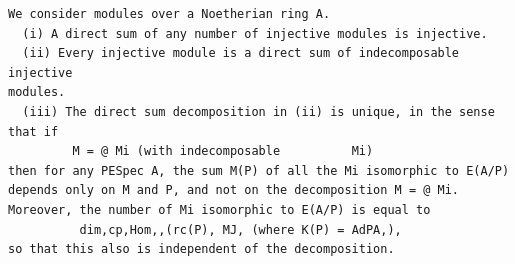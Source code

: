 \begin{theorem}\label{mcrt-auto-theorem-18-5}\uses{}
\begin{verbatim}
We consider modules over a Noetherian ring A.
  (i) A direct sum of any number of injective modules is injective.
  (ii) Every injective module is a direct sum of indecomposable injective
modules.
  (iii) The direct sum decomposition in (ii) is unique, in the sense that if
         M = @ Mi (with indecomposable          Mi)
then for any PESpec A, the sum M(P) of all the Mi isomorphic to E(A/P)
depends only on M and P, and not on the decomposition M = @ Mi.
Moreover, the number of Mi isomorphic to E(A/P) is equal to
          dim,cp,Hom,,(rc(P), MJ, (where K(P) = AdPA,),
so that this also is independent of the decomposition.
\end{verbatim}
\end{theorem}
